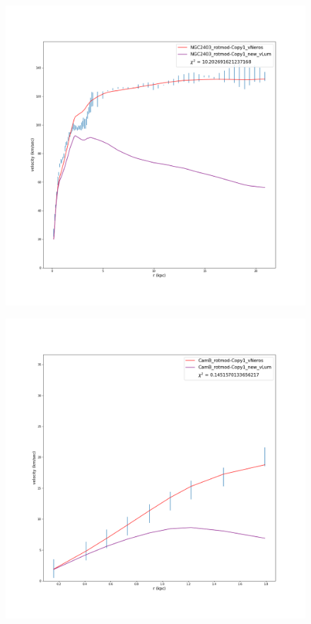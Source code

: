 \documentclass[reprint,%
 amsmath,amssymb,
 aps,
]{revtex4-1}
\begin{document}
\begin{figure}
\centering
\begin{minipage}{.5\textwidth}
  \centering
  \includegraphics[width=.95\linewidth]{Updated_Graphs_withnewcolorsandfonts/NGC2403_rotmod-Copy1_XueSofue.png}
  \label{fig:test1}
\end{minipage}%
\begin{minipage}{.5\textwidth}
  \centering
  \includegraphics[width=.95\linewidth]{Updated_Graphs_withnewcolorsandfonts/CamB_rotmod-Copy1_XueSofue.png}

\end{minipage}
\end{figure}
\end{document}
